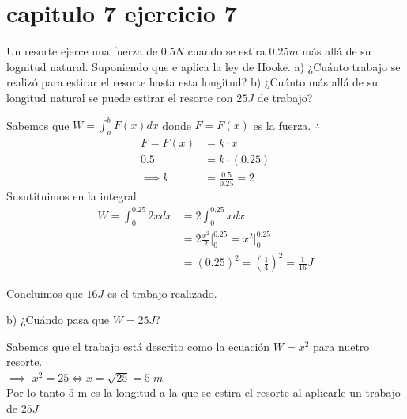 \chapter*{capitulo 7 ejercicio 7}
Un resorte ejerce una fuerza de $0.5N$ cuando se estira $0.25m$ más allá de su lognitud natural. Suponiendo que e aplica la ley de Hooke.
a) ¿Cuánto trabajo se realizó para estirar el resorte hasta esta longitud?
b) ¿Cuánto más allá de su longitud natural se puede estirar el resorte con $25J$ de trabajo?

Sabemos que $W=\displaystyle\int_{a}^{b}F(x)dx$
donde $F=F(x)$ es la fuerza.
$\therefore$
\begin{align*}
	F=F(x)&=k\cdot x\\
	0.5&=k\cdot (0.25)\\
    \implies k&=\frac{0.5}{0.25}=2
\end{align*}
Susutituimos en la integral.
\begin{align*}
    W=\int_{0}^{0.25}2xdx&=2\int_{0}^{0.25}xdx\\
&= 2\frac{x^2}{2}\bigg|_{0}^{0.25}=x^2\bigg|_{0}^{0.25}\\
&=(0.25)^2=(\frac{1}{4})^2=\frac{1}{16}J
\end{align*}

Concluimos que $16J$ es el trabajo realizado.

b) ¿Cuándo pasa que $W=25J$?

Sabemos que el trabajo está descrito como la ecuación $W=x^2$ para nuetro resorte.\\
$\implies$ $x^2=25\iff x=\sqrt{25}=5\;m$ \\
Por lo tanto 5 m es la longitud a la que se estira el resorte al aplicarle un trabajo de $25 J$
